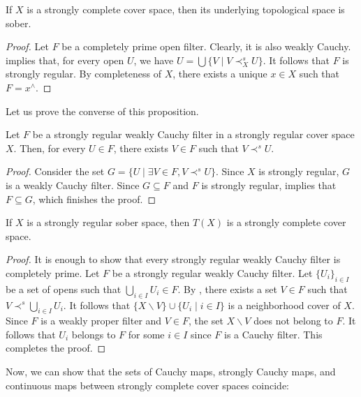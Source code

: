 \documentclass[reqno]{amsart}
\theoremstyle{definition}
\theoremstyle{remark}
\numberwithin{figure}{section}
\newcommand{\rb}{\prec}
\begin{document}
\begin{prop}[u-sober]
If $X$ is a strongly complete cover space, then its underlying topological space is sober.
\end{prop}
\begin{proof}
Let $F$ be a completely prime open filter.
Clearly, it is also weakly Cauchy.
 implies that, for every open $U$, we have $U = \bigcup \{ V \mid V \rb^s_X U \}$.
It follows that $F$ is strongly regular.
By completeness of $X$, there exists a unique $x \in X$ such that $F = x^\wedge$.
\end{proof}

Let us prove the converse of this proposition.

\begin{lem}
Let $F$ be a strongly regular weakly Cauchy filter in a strongly regular cover space $X$.
Then, for every $U \in F$, there exists $V \in F$ such that $V \rb^s U$.
\end{lem}
\begin{proof}
Consider the set $G = \{ U \mid \exists V \in F, V \rb^s U \}$.
Since $X$ is strongly regular, $G$ is a weakly Cauchy filter.
Since $G \subseteq F$ and $F$ is strongly regular,  implies that $F \subseteq G$, which finishes the proof.
\end{proof}

\begin{prop}[t-complete]
If $X$ is a strongly regular sober space, then $T(X)$ is a strongly complete cover space.
\end{prop}
\begin{proof}
It is enough to show that every strongly regular weakly Cauchy filter is completely prime.
Let $F$ be a strongly regular weakly Cauchy filter.
Let $\{ U_i \}_{i \in I}$ be a set of opens such that $\bigcup_{i \in I} U_i \in F$.
By , there exists a set $V \in F$ such that $V \rb^s \bigcup_{i \in I} U_i$.
It follows that $\{ X \backslash V \} \cup \{ U_i \mid i \in I \}$ is a neighborhood cover of $X$.
Since $F$ is a weakly proper filter and $V \in F$, the set $X \backslash V$ does not belong to $F$.
It follows that $U_i$ belongs to $F$ for some $i \in I$ since $F$ is a Cauchy filter.
This completes the proof.
\end{proof}

Now, we can show that the sets of Cauchy maps, strongly Cauchy maps, and continuous maps between strongly complete cover spaces coincide:
\end{document}
